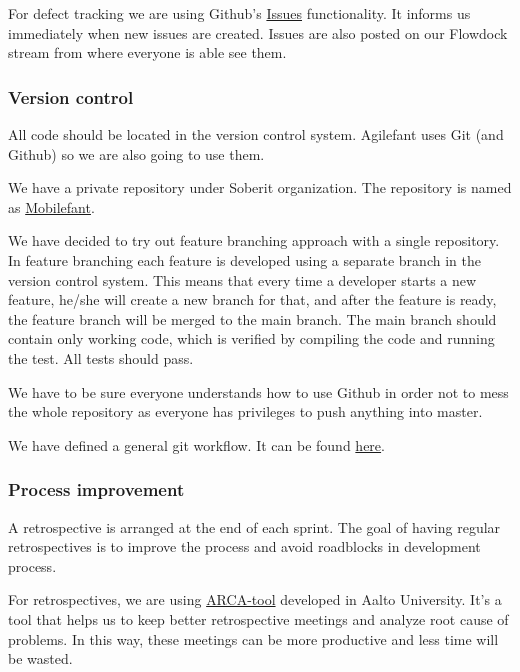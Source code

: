 For defect tracking we are using Github's
\href{https://github.com/soberit/mobilefant/issues?state=open}{Issues}
functionality. It informs us immediately when new issues are created. Issues are
also posted on our Flowdock stream from where everyone is able see them.

\subsubsection{Version control}

All code should be located in the version control system. Agilefant uses Git
(and Github) so we are also going to use them.

We have a private repository under Soberit organization. The repository is named
as \href{https://github.com/soberit/mobilefant}{Mobilefant}.

We have decided to try out feature branching approach with a single repository.
In feature branching each feature is developed using a separate branch in the
version control system. This means that every time a developer starts a new
feature, he/she will create a new branch for that, and after the feature is
ready, the feature branch will be merged to the main branch. The main branch
should contain only working code, which is verified by compiling the code and
running the test. All tests should pass.

We have to be sure everyone understands how to use Github in order not to mess
the whole repository as everyone has privileges to push anything into master.

We have defined a general git workflow. It can be found
\href{https://docs.google.com/document/d/1wAih0JzkrZ4ySUZ_MO-F8MvGkPXKHicYbG1972Sxo2w/edit?usp=sharing}{here}.

\subsubsection{Process improvement}

A retrospective is arranged at the end of each sprint. The goal of having
regular retrospectives is to improve the process and avoid roadblocks in
development process.

For retrospectives, we are using
\href{http://wirca.soberit.hut.fi/prod/}{ARCA-tool} developed in Aalto
University. It's a tool that helps us to keep better retrospective meetings and
analyze root cause of problems. In this way, these meetings can be more
productive and less time will be wasted.

